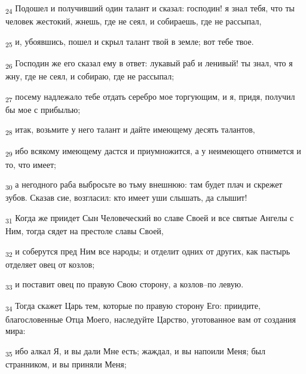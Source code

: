 \begin{tcolorbox}
\textsubscript{24} Подошел и получивший один талант и сказал: господин! я знал тебя, что ты человек жестокий, жнешь, где не сеял, и собираешь, где не рассыпал,
\end{tcolorbox}
\begin{tcolorbox}
\textsubscript{25} и, убоявшись, пошел и скрыл талант твой в земле; вот тебе твое.
\end{tcolorbox}
\begin{tcolorbox}
\textsubscript{26} Господин же его сказал ему в ответ: лукавый раб и ленивый! ты знал, что я жну, где не сеял, и собираю, где не рассыпал;
\end{tcolorbox}
\begin{tcolorbox}
\textsubscript{27} посему надлежало тебе отдать серебро мое торгующим, и я, придя, получил бы мое с прибылью;
\end{tcolorbox}
\begin{tcolorbox}
\textsubscript{28} итак, возьмите у него талант и дайте имеющему десять талантов,
\end{tcolorbox}
\begin{tcolorbox}
\textsubscript{29} ибо всякому имеющему дастся и приумножится, а у неимеющего отнимется и то, что имеет;
\end{tcolorbox}
\begin{tcolorbox}
\textsubscript{30} а негодного раба выбросьте во тьму внешнюю: там будет плач и скрежет зубов. Сказав сие, возгласил: кто имеет уши слышать, да слышит!
\end{tcolorbox}
\begin{tcolorbox}
\textsubscript{31} Когда же приидет Сын Человеческий во славе Своей и все святые Ангелы с Ним, тогда сядет на престоле славы Своей,
\end{tcolorbox}
\begin{tcolorbox}
\textsubscript{32} и соберутся пред Ним все народы; и отделит одних от других, как пастырь отделяет овец от козлов;
\end{tcolorbox}
\begin{tcolorbox}
\textsubscript{33} и поставит овец по правую Свою сторону, а козлов--по левую.
\end{tcolorbox}
\begin{tcolorbox}
\textsubscript{34} Тогда скажет Царь тем, которые по правую сторону Его: приидите, благословенные Отца Моего, наследуйте Царство, уготованное вам от создания мира:
\end{tcolorbox}
\begin{tcolorbox}
\textsubscript{35} ибо алкал Я, и вы дали Мне есть; жаждал, и вы напоили Меня; был странником, и вы приняли Меня;
\end{tcolorbox}
